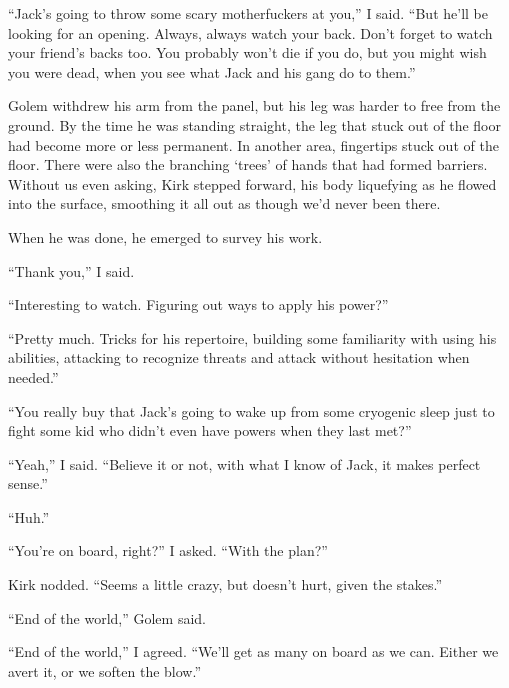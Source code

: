 ``Jack's going to throw some scary motherfuckers at you,'' I said.  ``But he'll be looking for an opening.  Always, always watch your back.  Don't forget to watch your friend's backs too.  You probably won't die if you do, but you might wish you were dead, when you see what Jack and his gang do to them.''



Golem withdrew his arm from the panel, but his leg was harder to free from the ground.  By the time he was standing straight, the leg that stuck out of the floor had become more or less permanent.  In another area, fingertips stuck out of the floor.  There were also the branching `trees' of hands that had formed barriers.  Without us even asking, Kirk stepped forward, his body liquefying as he flowed into the surface, smoothing it all out as though we'd never been there.



When he was done, he emerged to survey his work.



``Thank you,'' I said.



``Interesting to watch.  Figuring out ways to apply his power?''



``Pretty much.  Tricks for his repertoire, building some familiarity with using his abilities, attacking to recognize threats and attack without hesitation when needed.''



``You really buy that Jack's going to wake up from some cryogenic sleep just to fight some kid who didn't even have powers when they last met?''



``Yeah,'' I said.  ``Believe it or not, with what I know of Jack, it makes perfect sense.''



``Huh.''



``You're on board, right?'' I asked.  ``With the plan?''



Kirk nodded.  ``Seems a little crazy, but doesn't hurt, given the stakes.''



``End of the world,'' Golem said.



``End of the world,'' I agreed.  ``We'll get as many on board as we can.  Either we avert it, or we soften the blow.''



